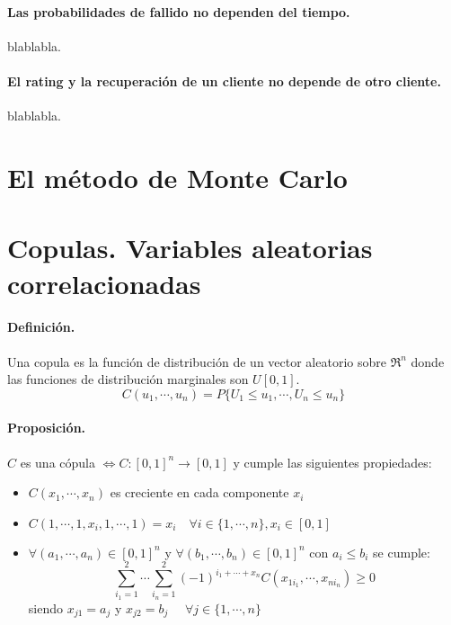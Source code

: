 \paragraph{Las probabilidades de fallido no dependen del tiempo.}
blablabla.

\paragraph{El rating y la recuperaci\'on de un cliente no depende de otro cliente.}
blablabla.



\section{El m\'etodo de Monte Carlo}




\section{Copulas. Variables aleatorias correlacionadas}

\paragraph{Definici\'on.}
Una copula es la funci\'on de distribuci\'on de un vector aleatorio sobre 
$\Re^n$ donde las funciones de distribuci\'on marginales son $U[0,1]$. 
\begin{displaymath}
C(u_1, \cdots, u_n) = P\{U_1 \leq u_1, \cdots, U_n \leq u_n\}
\end{displaymath}

\paragraph{Proposici\'on.}
$C$ es una c\'opula $\iff C:[0,1]^n \to [0,1]$ y cumple las siguientes 
propiedades:
\begin{itemize}
\item $C(x_1, \cdots, x_n)$ es creciente en cada componente $x_i$
\item $C(1, \cdots, 1, x_i, 1, \cdots, 1) = x_i \quad \forall i \in \{1, \cdots, n\}, x_i \in [0,1]$
\item $\forall (a_1, \cdots, a_n) \in [0,1]^n$ y $\forall (b_1, \cdots, b_n) \in [0,1]^n$ con
$a_i \leq b_i$ se cumple:
\begin{displaymath}
\sum_{i_1=1}^{2} \cdots \sum_{i_n=1}^{2} (-1)^{i_1+\cdots+x_n} C(x_{1i_1},\cdots,x_{ni_n}) \geq 0
\end{displaymath}
\noindent siendo $x_{j1}=a_j$ y $x_{j2}=b_j$ $\quad \forall j \in \{1, \cdots, n\}$
\end{itemize}

